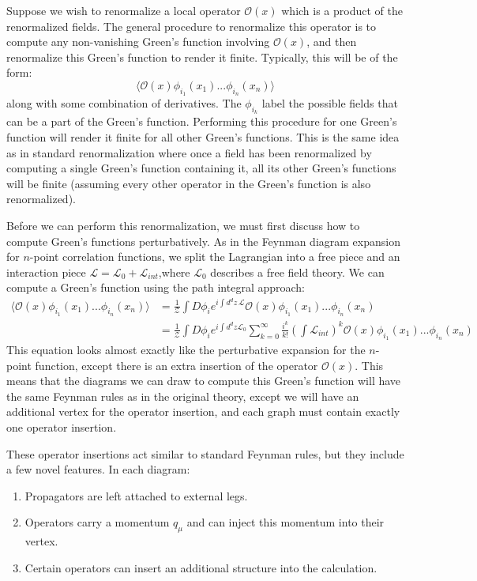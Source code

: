 \documentclass[11pt, oneside]{article}   	%
\theoremstyle{definition}
\begin{document}
Suppose we wish to renormalize a local operator $\mathcal O(x)$ which is a product of the renormalized fields. The 
general procedure to renormalize this operator is to compute any non-vanishing Green's function involving 
$\mathcal O(x)$, and then renormalize this Green's function to render it finite. Typically, this will be of the form:
\begin{equation}
	\langle \mathcal O(x) \phi_{i_1}(x_1) ... \phi_{i_n}(x_n)\rangle
\end{equation}
along with some combination of derivatives. The $\phi_{i_k}$ label the possible fields that can be a part of the Green's 
function. Performing this procedure for one Green's function will render it finite for all other Green's functions. This is 
the same idea as in standard renormalization where once a field has been renormalized by computing a single 
Green's function containing it, all its other Green's functions will be finite (assuming every other operator in the Green's 
function is also renormalized). 

Before we can perform this renormalization, we must first discuss how to compute Green's functions perturbatively. As in 
the Feynman diagram expansion for $n$-point correlation functions, we split the Lagrangian into a free piece and an 
interaction piece $\mathcal L = \mathcal L_0 + \mathcal L_{int}$,where $\mathcal L_0$ describes a free field theory. We 
can compute a Green's function using the path integral approach:
\begin{align}
	\langle \mathcal O(x) \phi_{i_1}(x_1) ... \phi_{i_n}(x_n)\rangle &= \frac{1}{\mathcal Z} \int D\phi_i e^{i\int d^dz\,
	\mathcal L} \mathcal O(x) \phi_{i_1}(x_1) ... \phi_{i_n}(x_n) \\
	&= \frac{1}{\mathcal Z} \int D\phi_i e^{i\int d^d z \mathcal L_0} \sum_{k = 0}^\infty \frac{i^k}{k!}\left(\int \mathcal L_{int}
	\right)^k \mathcal O(x) \phi_{i_1}(x_1) ... \phi_{i_n}(x_n)
\end{align}
This equation looks almost exactly like the perturbative expansion for the $n$-point function, except there is an extra insertion of the operator $\mathcal O(x)$. This 
means that the diagrams we can draw to compute this Green's function will have the same Feynman rules as in the original theory, except we will have an 
additional vertex for the operator insertion, and each graph must contain exactly one operator insertion. 

These operator insertions act similar to standard Feynman rules, but they include a few novel features. In each diagram:
\begin{enumerate}
	\item Propagators are left attached to external legs. 
	\item Operators carry a momentum $q_\mu$ and can inject this momentum into their vertex.
	\item Certain operators can insert an additional structure into the calculation.
\end{enumerate}
\end{document}
